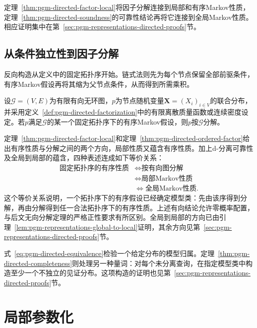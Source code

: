 定理~\ref{thm:pgm-directed-factor-local}将因子分解连接到局部和有序Markov性质，定理~\ref{thm:pgm-directed-soundness}的可靠性结论再将它连接到全局Markov性质。相应证明集中在第~\ref{sec:pgm-representations-directed-proofs}节。

\subsection{从条件独立性到因子分解}
\label{sec:pgm-directed-ci-to-factor}

反向构造从定义中的固定拓扑序开始。链式法则先为每个节点保留全部前驱条件，有序Markov假设再将其缩为父节点条件，从而得到所需乘积。

\begin{theorem}[有序假设导出有向分解]
  \label{thm:pgm-directed-ordered-factor}
  设$\mathcal{G}=(V,E)$为有限有向无环图，$p$为节点随机变量$\bm{X}=(X_i)_{i\in V}$的联合分布，并采用定义~\ref{def:pgm-directed-factorization}中的有限离散质量函数或连续密度设定。若$p$满足$\mathcal{G}$的某一个固定拓扑序下的有序Markov假设，则$p$按$\mathcal{G}$分解。
\end{theorem}

定理~\ref{thm:pgm-directed-factor-local}和定理~\ref{thm:pgm-directed-ordered-factor}给出有序性质与分解之间的两个方向，局部性质又蕴含有序性质。加上d-分离可靠性及全局到局部的蕴含，四种表述连成如下等价关系：
\begin{equation}
  \begin{aligned}
    \text{固定拓扑序的有序性质}
      &\Longleftrightarrow \text{按有向图分解}\\
      &\Longleftrightarrow \text{局部Markov性质}\\
      &\Longleftrightarrow \text{全局Markov性质}.
  \end{aligned}
  \label{eq:pgm-directed-equivalence}
\end{equation}
这个等价关系说明，一个拓扑序下的有序假设已经确定模型类：先由该序得到分解，再由分解得到任一合法拓扑序下的有序性质。上述有向结论允许零概率配置，与后文无向分解定理的严格正性要求有所区别。全局到局部的方向已由引理~\ref{lem:pgm-representations-global-to-local}证明，其余方向见第~\ref{sec:pgm-representations-directed-proofs}节。

式~\eqref{eq:pgm-directed-equivalence}检验一个给定分布的模型归属。定理~\ref{thm:pgm-directed-completeness}则处理另一种量词：对每个未分离查询，在指定模型类中构造至少一个不独立的见证分布。这项构造的证明也见第~\ref{sec:pgm-representations-directed-proofs}节。

\section{局部参数化}
\label{sec:pgm-directed-local-parameterization}


